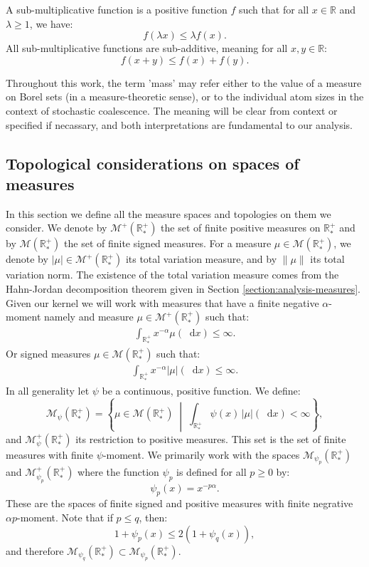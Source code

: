 \documentclass[11pt,a4paper]{article}
\newcommand{\RR}{\mathbb{R}}
\newcommand{\RRP}{\mathbb{R}^+_*}
\newcommand{\MC}{\mathcal{M}}
\newcommand{\dd}{\mathop{}\!\mathrm{d}}
\begin{document}
A sub-multiplicative function is a positive function $f$ such that for all $x \in \RR$ and $\lambda \geq 1$, we have:
\[
f(\lambda x) \leq \lambda f(x).
\]
All sub-multiplicative functions are sub-additive, meaning for all $x, y \in \RR$:
\[
f(x+y) \leq f(x) + f(y).
\]

Throughout this work, the term 'mass' may refer either to the value of a measure on Borel sets (in a measure-theoretic sense), or to the individual atom sizes in the context of stochastic coalescence. The meaning will be clear from context or specified if necassary, and both interpretations are fundamental to our analysis.

\subsection{Topological considerations on spaces of measures}

In this section we define all the measure spaces and topologies on them we consider. We denote by $\MC^+(\RRP)$ the set of finite positive measures on $\RRP$ and by $\MC(\RRP)$ the set of finite signed measures. For a measure $\mu \in \MC(\RRP)$, we denote by $|\mu| \in \MC^+(\RRP)$ its total variation measure, and by $\|\mu\|$ its total variation norm. The existence of the total variation measure comes from the Hahn-Jordan decomposition theorem given in Section \ref{section:analysis-measures}. Given our kernel we will work with measures that have a finite negative $\alpha$-moment namely and measure $\mu \in  \MC^+(\RRP)$ such that:
\begin{align*}
    \int_{\RRP} x^{-\alpha} \mu(\dd x) \leq  \infty.
\end{align*}
Or signed measures $\mu \in  \MC(\RRP)$ such that:
\begin{align*}
    \int_{\RRP} x^{-\alpha} |\mu|(\dd x) \leq  \infty.
\end{align*}
In all generality let $\psi$ be a continuous, positive function. We define:
\[
\MC_{\psi}(\RRP) = \left\lbrace \mu \in \MC(\RRP) \;\middle|\; \int_{\RRP} \psi(x)\,|\mu|(\dd x) < \infty \right\rbrace,
\]
and $\MC^+_{\psi}(\RRP)$ its restriction to positive measures. This set is the set of finite measures with finite $\psi$-moment. We primarily work with the spaces $\MC_{\psi_p}(\RRP)$ and $\MC^+_{\psi_p}(\RRP)$ where the function $\psi_p$ is defined for all $p \geq 0$ by:
\[
\psi_p(x) = x^{-p\alpha}.
\]
These are the spaces of finite signed and positive measures with finite negrative $\alpha p$-moment. Note that if $p \leq q$, then:
\[
1 + \psi_p(x) \leq 2(1 + \psi_q(x)),
\]
and therefore $\MC_{\psi_q}(\RRP) \subset \MC_{\psi_p}(\RRP)$. 
\end{document}
